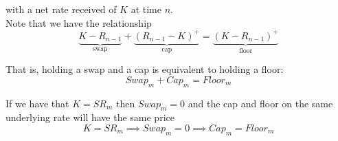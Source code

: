 \documentclass[12pt]{article}
\newlength\tindent
\renewcommand{\indent}{\hspace*{\tindent}}
\begin{document}
with a net rate received of $K$ at time $n$. \\

Note that we have the relationship
\begin{equation*}
	\underbrace{ K - R_{n - 1} }_\text{swap} + \underbrace{ (R_{n - 1} - K)^+ }_\text{cap} = \underbrace{ (K - R_{n - 1})^+ }_\text{floor}
\end{equation*}

That is, holding a swap and a cap is equivalent to holding a floor:
\begin{equation*}
	Swap_m + Cap_m = Floor_m
\end{equation*}

\indent If we have that $K = SR_m$ then $Swap_m = 0$ and the cap and floor on the same underlying rate will have the same price
\begin{equation*}
	K = SR_m \implies Swap_m = 0 \implies Cap_m = Floor_m
\end{equation*}
\end{document}
